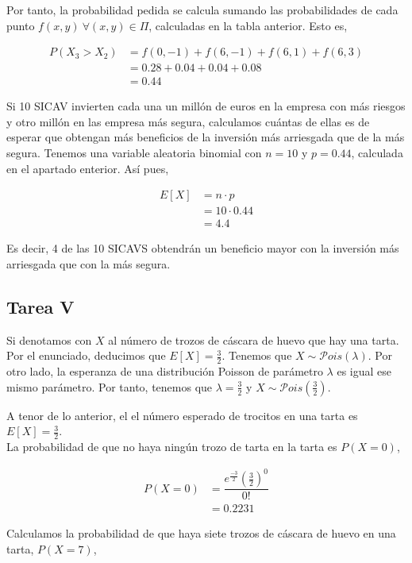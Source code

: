 \documentclass[12pt,a4paper,twoside,openright,titlepage,final]{article}
\begin{document}
Por tanto, la probabilidad pedida se calcula sumando las probabilidades de cada punto $f(x,y) \ \forall (x,y) \in \Pi$, calculadas en la tabla anterior. Esto es,

\begin{align*}
P(X_3 > X_2) & = f(0,-1) + f(6, -1) + f(6,1) + f(6,3) \\
& = 0.28 + 0.04 + 0.04 + 0.08 \\
& = 0.44
\end{align*} 

Si 10 SICAV invierten cada una un millón de euros en la empresa con más riesgos y otro millón en las empresa más segura, calculamos cuántas de ellas es de esperar que obtengan más beneficios de la inversión más arriesgada que de la más segura. Tenemos una variable aleatoria binomial con $n =10$ y $p = 0.44$, calculada en el apartado enterior. Así pues,

\begin{align*}
E[X] & = n \cdot p \\
& = 10 \cdot 0.44 \\
& = 4.4 
\end{align*}

Es decir, 4 de las 10 SICAVS obtendrán un beneficio mayor con la inversión más arriesgada que con la más segura.

\subsection{Tarea V}

Si denotamos con $X$ al número de trozos de cáscara de huevo que hay una tarta. Por el enunciado, deducimos que $E[X] = \frac{3}{2}$. Tenemos que $X \sim \mathcal{P}ois(\lambda)$. Por otro lado, la esperanza de una distribución Poisson de parámetro $\lambda$ es igual ese mismo parámetro. Por tanto, tenemos que $\lambda = \frac{3}{2}$ y $X \sim \mathcal{P}ois(\frac{3}{2})$.

A tenor de lo anterior, el el número esperado de trocitos en una tarta es $E[X] = \frac{3}{2}$.\\

La probabilidad de que no haya ningún trozo de tarta en la tarta es $P(X=0)$,

\begin{align*}
P(X=0) & = \dfrac{e^{\frac{-3}{2}} \left(\frac{3}{2}\right)^0 }{0!} \\ & = 0.2231
\end{align*}

Calculamos la probabilidad de que haya siete trozos de cáscara de huevo en una tarta, $P(X=7)$,
\end{document}
